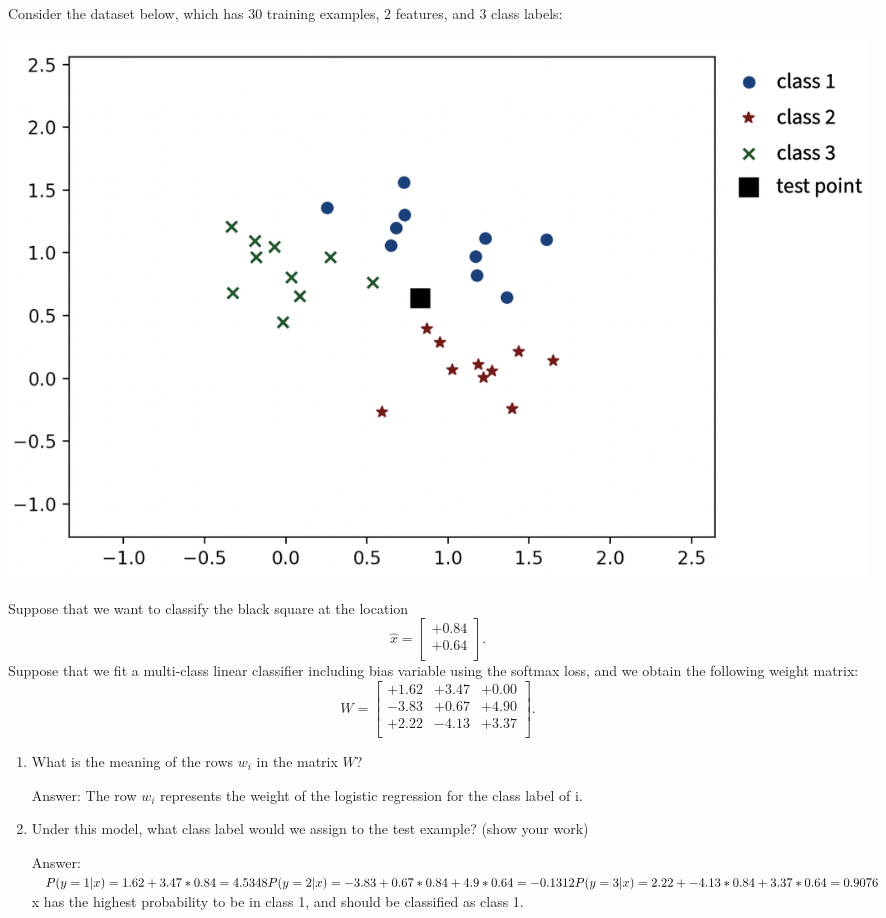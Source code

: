 \documentclass{article}
\def\ans#1{\par\gre{Answer: #1}}
\def\blu#1{{\color{blu}#1}}
\def\gre#1{{\color{gre}#1}}
\begin{document}
Consider the dataset below, which has $30$ training examples, $2$ features, and $3$ class labels:\\
\begin{center}\includegraphics[scale=0.3]{a4f/softmaxData.png}\end{center}
Suppose that we want to classify the black square at the location
\[
\hat{x} = \begin{bmatrix}+0.84 \\ +0.64\\ \end{bmatrix}.
\]
Suppose that we fit a multi-class linear classifier including bias variable using the softmax loss, and we obtain the following weight matrix:
\[
W =
\begin{bmatrix}
+1.62 & +3.47 & +0.00\\
-3.83 & +0.67 & +4.90\\
+2.22 & -4.13 & +3.37\\
\end{bmatrix}.
\]
\blu{
\begin{enumerate}
\item What is the meaning of the rows $w_i$ in the matrix $W$?
\ans{The row $w_i$ represents the weight of the logistic regression for the class label of i.}
\item Under this model, what class label would we assign to the test example? (show your work)
\ans{$P(y = 1 | x) = 1.62 + 3.47*0.84 = 4.5348 \\
P(y = 2 | x) = -3.83 + 0.67*0.84 + 4.9*0.64 = -0.1312 \\
P(y = 3 | x) = 2.22 + -4.13 * 0.84 + 3.37 * 0.64 = 0.9076$\\
x has the highest probability to be in class 1, and should be classified as class 1.}
\end{enumerate}}
\end{document}
